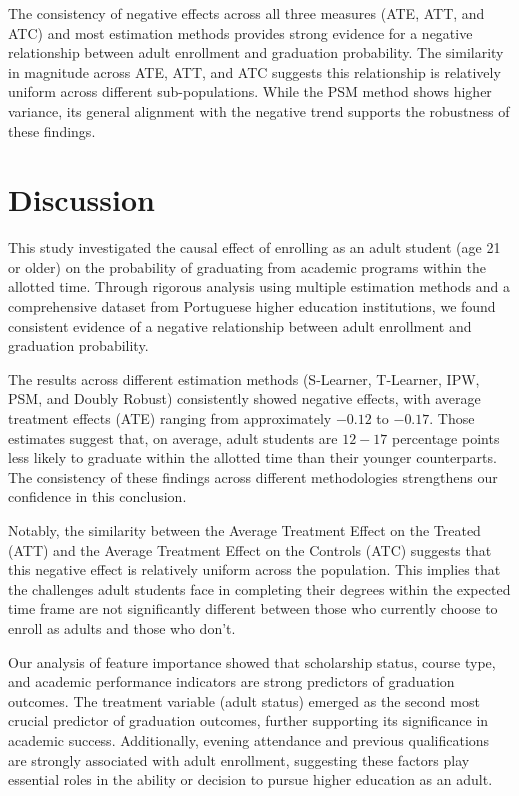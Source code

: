 \documentclass{article}
\begin{document}
The consistency of negative effects across all three measures (ATE, ATT, and ATC) and most estimation methods provides strong evidence for a negative relationship between adult enrollment and graduation probability. The similarity in magnitude across ATE, ATT, and ATC suggests this relationship is relatively uniform across different sub-populations. While the PSM method shows higher variance, its general alignment with the negative trend supports the robustness of these findings.

\section{Discussion}

This study investigated the causal effect of enrolling as an adult student (age 21 or older) on the probability of graduating from academic programs within the allotted time. Through rigorous analysis using multiple estimation methods and a comprehensive dataset from Portuguese higher education institutions, we found consistent evidence of a negative relationship between adult enrollment and graduation probability.

The results across different estimation methods (S-Learner, T-Learner, IPW, PSM, and Doubly Robust) consistently showed negative effects, with average treatment effects (ATE) ranging from approximately $-0.12$ to $-0.17$. Those estimates suggest that, on average, adult students are $12-17$ percentage points less likely to graduate within the allotted time than their younger counterparts. The consistency of these findings across different methodologies strengthens our confidence in this conclusion.

Notably, the similarity between the Average Treatment Effect on the Treated (ATT) and the Average Treatment Effect on the Controls (ATC) suggests that this negative effect is relatively uniform across the population. This implies that the challenges adult students face in completing their degrees within the expected time frame are not significantly different between those who currently choose to enroll as adults and those who don't.

Our analysis of feature importance showed that scholarship status, course type, and academic performance indicators are strong predictors of graduation outcomes. The treatment variable (adult status) emerged as the second most crucial predictor of graduation outcomes, further supporting its significance in academic success. Additionally, evening attendance and previous qualifications are strongly associated with adult enrollment, suggesting these factors play essential roles in the ability or decision to pursue higher education as an adult.
\end{document}
